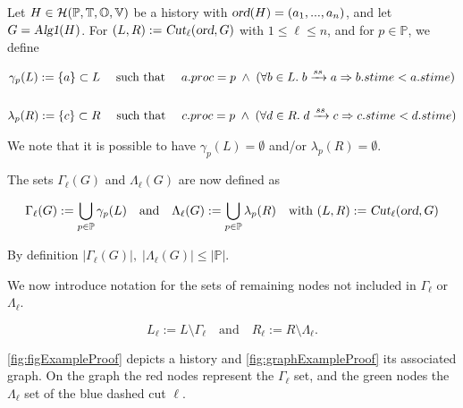 \documentclass[12pt]{article}
\begin{document}
\begin{definition}
Let $H\in\mathcal{H}(\mathbb{P}, \mathbb{T}, \mathbb{O}, \mathbb{V})$ be a history with \mbox{$\textsl{ord}(H)=(a_1,...,a_n)$}, and let \mbox{$G=\textsl{Alg1}(H)$}.
For \mbox{$(L,R):=\textsl{Cut}_\ell(\textsl{ord},G)$} with $1\leq\ell\leq n$, and for $p\in\mathbb{P}$, we define


\begin{gather*}
\gamma_p(L):= \{a\}\subset L \quad\text{ such that }\quad
a.proc=p\;
\land\;(\forall b\in L.\;b\xrightarrow{ss}a\Rightarrow b.stime < a.stime )
\\
\\
\lambda_p(R):=\{c\}\subset R \quad\text{ such that }\quad
c.proc=p\;
\land\;(\forall d\in R.\;d\xrightarrow{ss}c\Rightarrow c.stime < d.stime )
\end{gather*}

We note that it is possible to have \mbox{$\gamma_p(L)=\emptyset$} and/or \mbox{$\lambda_p(R)=\emptyset$}.

\vspace{1em}

\noindent The sets \mbox{$\Gamma_\ell(G)$} and \mbox{$\Lambda_\ell(G)$} are now defined as 

\begin{gather*}
\Gamma_\ell(G) := \displaystyle\bigcup_{p \in \mathbb{P}}\gamma_p(L)
\quad\text{and}\quad
\Lambda_\ell(G) := \displaystyle\bigcup_{p \in \mathbb{P}}\lambda_p(R)\quad\text{with }(L,R):=\textsl{Cut}_\ell(\textsl{ord},G)
\end{gather*}

\noindent By definition $|\Gamma_\ell(G)|,\;|\Lambda_\ell(G)|\leq|\mathbb{P}|$.


We now introduce notation for the sets of remaining nodes not included in $\Gamma_\ell$ or $\Lambda_\ell$.

\[
L_\ell := L \setminus \Gamma_\ell \quad\text{and}\quad R_\ell := R \setminus \Lambda_\ell.
\]
\end{definition}

\vspace{1em}

\autoref{fig:figExampleProof} depicts a history and \autoref{fig:graphExampleProof} its associated graph. On the graph the red nodes represent the $\Gamma_\ell$ set, and the green nodes the $\Lambda_\ell$ set of the blue dashed cut $\ell$.
\end{document}
